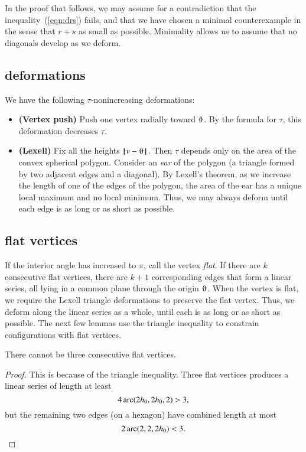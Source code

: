 In the proof that follows, we may assume for a contradiction that the
inequality~(\ref{eqn:drs}) fails, and that we have chosen a minimal counterexample in the sense that $r+s$ as small as possible.   Minimality allows us to assume that no diagonals develop as we deform.

\subsection{deformations}

We have the following $\tau$-nonincreasing deformations:
\begin{itemize}
\item {\bf (Vertex push)} Push one vertex radially toward $\orgn$.  By the formula for $\tau$, this deformation decreases $\tau$.
\item {\bf (Lexell)} Fix all the heights $\norm{v}{\orgn}$. Then $\tau$ depends only on the area of the convex spherical polygon.  Consider an {\it ear} of the polygon (a triangle formed by two adjacent edges and a diagonal).  By Lexell's theorem, as we increase the length of one of the edges of the polygon, the area of the ear has a unique local maximum and no local minimum.  Thus, we may always deform until each edge is as long or as short as possible.
\end{itemize}

\subsection{flat vertices}

If the interior angle has increased to $\pi$, call the vertex {\it flat}. If there are $k$ consecutive flat vertices, there are  $k+1$ corresponding edges that form a linear series, all lying in a common plane through the origin $\orgn$.  When the vertex is flat, we require the Lexell triangle deformations to preserve the flat vertex.  Thus, we deform along the linear series as a whole, until each is as long or as short as possible.  The next few lemmas use the triangle inequality to constrain configurations with flat vertices.

\begin{lemma}
There cannot be three consecutive flat vertices.
\end{lemma}

\begin{proof} This is because of the triangle inequality.  Three flat vertices produces a linear series of length at least
$$
4\operatorname{arc}(2{h_0},2{h_0},2) > 3,
$$
but the remaining two edges (on a hexagon) have combined length at most
$$
2\operatorname{arc}(2,2,2{h_0}) < 3.
$$
\end{proof}

